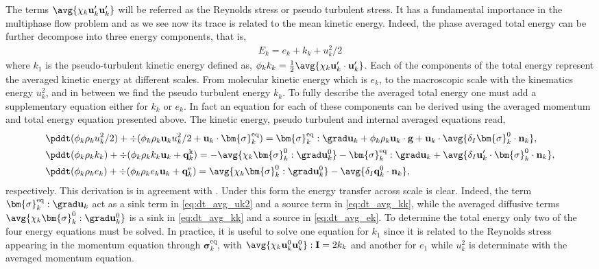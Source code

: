 The terms $\avg{\chi_k \textbf{u}_k'\textbf{u}_k'}$ will be referred as the Reynolds stress or pseudo turbulent stress. 
It has a fundamental importance in the multiphase flow problem and as we see now its trace is related to the mean kinetic energy. 
Indeed, the phase averaged total energy can be further decompose into three energy components, that is,  
\begin{align}
    E_k = e_k + k_k + u_k^2/2
    \label{eq:E_def}
\end{align}
where $k_1$ is the pseudo-turbulent kinetic energy defined as, $\phi_k k_k = \frac{1}{2}\avg{\chi_k \textbf{u}_k'\cdot \textbf{u}_k'}$. 
Each of the components of the total energy represent the averaged kinetic energy at different scales. 
From molecular kinetic energy which is $e_k$, to the macroscopic scale with the kinematics   energy $u_k^2$, and in between we find the pseudo turbulent energy $k_k$. 
To fully describe the averaged total energy one must add a supplementary equation either for $k_k$ or $e_k$. 
In fact an equation for each of these components can be derived using the averaged momentum and total energy equation presented above. 
The kinetic energy, pseudo turbulent and internal averaged equations read, 
\begin{align}
    \label{eq:dt_avg_uk2}
    &\pddt (\phi_k \rho_ku_k^2/2)  
    + \div (
        \phi_k \rho_k\textbf{u}_ku_k^2/2
        + \textbf{u}_k \cdot \bm{\sigma}_k^\text{eq}
    )
    = 
    \bm{\sigma}_k^\text{eq} : \grad \textbf{u}_k
    + \phi_k \rho_k \textbf{u}_k\cdot \textbf{g} 
    +  \textbf{u}_k\cdot \avg{\delta_I \bm{\sigma}_k^0 \cdot \textbf{n}_k},\\
    \label{eq:dt_avg_kk}
    &\pddt (\phi_k\rho_kk_k)  
    + \div (
        \phi_k\rho_kk_k\textbf{u}_k
        + \textbf{q}_k^\text{k} 
        )
    = 
    - \avg{\chi_k\bm{\sigma}_k^0 : \grad \textbf{u}_k^0}
    - \bm{\sigma}_k^\text{eq} : \grad \textbf{u}_k
    + \avg{\delta_I \textbf{u}_k' \cdot \bm{\sigma}_k^0 \cdot \textbf{n}_k},\\
    \label{eq:dt_avg_ek}
    &\pddt (\phi_k\rho_ke_k)  
    + \div (
        \phi_k \rho_ke_k\textbf{u}_k
        +
        \textbf{q}_k^\text{e} 
        )
    = 
    \avg{\chi_k\bm{\sigma}_k^0 : \grad \textbf{u}_k^0}
    - \avg{\delta_I \textbf{q}_k^0 \cdot \textbf{n}_k},
\end{align}
respectively. 
This derivation is in agreement with \citet{morel2015mathematical}. 
Under this form the energy transfer across scale is clear. 
Indeed, the term $\bm{\sigma}_k^\text{eq} : \grad \textbf{u}_k$ act as a sink term in \ref{eq:dt_avg_uk2} and a source term in \ref{eq:dt_avg_kk}, while the averaged diffusive terms $\avg{\chi_k\bm{\sigma}_k^0 : \grad \textbf{u}_k^0}$ is a sink in \ref{eq:dt_avg_kk} and a source in \ref{eq:dt_avg_ek}. 
To determine the total energy only two of the four energy equations must be solved. 
In practice, it is useful to solve one equation for $k_1$ since it is related to the Reynolds stress appearing in the momentum equation through $\bm{\sigma}^\text{eq}_k$, with $\avg{\chi_k \textbf{u}_k^0 \textbf{u}_k^0}: \textbf{I} = 2 k_k$ and another for $e_1$ while $u_k^2$ is determinate with the averaged momentum equation. 


